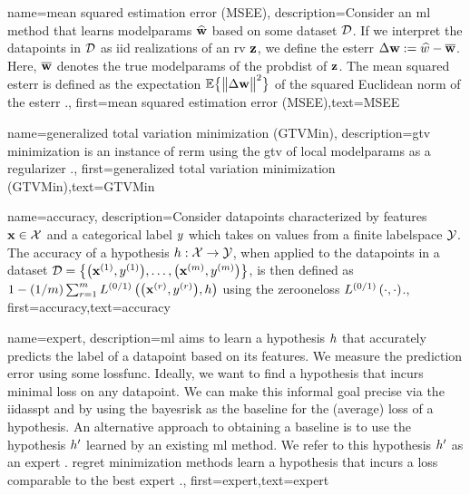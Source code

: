 {name={mean squared estimation error (MSEE)},
	description={Consider an \gls{ml} method that 
		learns \gls{modelparams} $\widehat{{\bf w}}$ based on some \gls{dataset} $\mathcal{D}$. 
		If we interpret the \gls{datapoint}s in $\mathcal{D}$ as \gls{iid} \gls{realization}s of an \gls{rv} ${\bf z}$, 
		we define the \gls{esterr} $\Delta {\bf w} := \widehat{w} - \overline{{\bf w}}$. 
		Here, $\overline{{\bf w}}$ denotes the true \gls{modelparams} of the \gls{probdist} 
		of ${\bf z}$. The \gls{mean} squared \gls{esterr} is 
		defined as the \gls{expectation} $\mathbb{E} \big\{ \big\| \Delta {\bf w} \big\|^{2} \big\}$ of the 
		squared Euclidean \gls{norm} of the \gls{esterr} \cite{LC,kay}.},
	first={mean squared estimation error (MSEE)},text={MSEE} 
}

{name={generalized total variation minimization (GTVMin)},
	description={\gls{gtv} minimization is an instance of \gls{rerm} 
		using the \gls{gtv} of local \gls{modelparams} as a \gls{regularizer} \cite{ClusteredFLTVMinTSP}.},
	first={generalized total variation minimization (GTVMin)},text={GTVMin} 
}


{name={accuracy},
	description={Consider \gls{datapoint}s characterized by \gls{feature}s ${\bf x} \in \mathcal{X}$ and 
		a categorical label $y$ which takes on values from a finite \gls{labelspace} $\mathcal{Y}$. The 
		accuracy of a \gls{hypothesis} $h: \mathcal{X} \rightarrow \mathcal{Y}$, when applied 
		to the \gls{datapoint}s in a \gls{dataset} $\mathcal{D} = \big\{ \big({\bf x}^{(1)}, y^{(1)} \big), \ldots, \big({\bf x}^{(m)},y^{(m)}\big) \big\}$, 
		is then defined as $1 - (1/m)\sum_{r=1}^{m} L^{(0/1)}\left(\big({\bf x}^{(r)},y^{(r)}\big),h \right)$ using the \gls{zerooneloss} $L^{(0/1)}\left(\cdot,\cdot \right)$.},
	first={accuracy},text={accuracy} 
}





{name={expert},
	description={\gls{ml} aims to learn a \gls{hypothesis} $h$ that accurately predicts the \gls{label} 
		of a \gls{datapoint} based on its \gls{feature}s. We measure the \gls{prediction} error using 
		some \gls{lossfunc}. Ideally, we want to find a \gls{hypothesis} that incurs minimal \gls{loss} 
		on any \gls{datapoint}. We can make this informal goal precise via the \gls{iidasspt} 
		and by using the \gls{bayesrisk} as the \gls{baseline} for the (average) \gls{loss} of a \gls{hypothesis}. 
		An alternative approach to obtaining a \gls{baseline} is to use the \gls{hypothesis} $h'$ learned 
		by an existing \gls{ml} method. We refer to this \gls{hypothesis} $h'$ as an expert \cite{PredictionLearningGames}. \Gls{regret} minimization methods learn a \gls{hypothesis}
		that incurs a \gls{loss} comparable to the best expert \cite{PredictionLearningGames,HazanOCO}.},
	first={expert},text={expert} 
}

